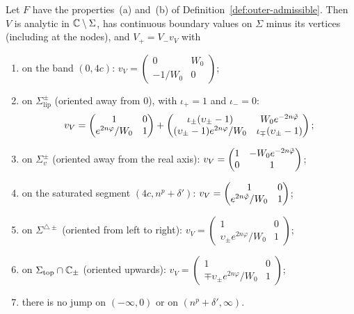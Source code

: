 \begin{lemma}[Jumps of $V$]\label{lem:jumpsV}
Let $F$ have the properties~(a) and~(b) of Definition~\ref{def:outer-admissible}. Then $V$ is analytic in
$\mathbb{C}\setminus\Sigma$, has continuous boundary values on $\Sigma$ minus its vertices (including at the nodes), and
$V_+=V_-v_V$ with
\begin{enumerate}
\item[(a)] on the band $(0,4c)$: $v_V=\begin{pmatrix}0&W_0\\-1/W_0&0\end{pmatrix}$;
\item[(b)] on $\Sigma^\pm_{\mathrm{lip}}$ (oriented away from $0$), with $\iota_+=1$ and $\iota_-=0$:
  \[
    v_V=\begin{pmatrix}1&0\\e^{2n\varphi}/W_0&1\end{pmatrix}
    +\begin{pmatrix}\iota_\pm(\upsilon_\pm-1)&W_0e^{-2n\tilde\varphi}\\(\upsilon_\pm-1)e^{2n\varphi}/W_0&\iota_\mp(\upsilon_\pm-1)\end{pmatrix};
  \]
\item[(c)] on $\Sigma_v^\pm$ (oriented away from the real axis): $v_V=\begin{pmatrix}1&-W_0e^{-2n\tilde\varphi}\\0&1\end{pmatrix}$;
\item[(d)] on the saturated segment $(4c,n^p+\delta')$: $v_V=\begin{pmatrix}1&0\\e^{2n\tilde\varphi}/W_0&1\end{pmatrix}$;
\item[(e)] on $\Sigma^{\triangle\pm}$ (oriented from left to right): $v_V=\begin{pmatrix}1&0\\\upsilon_\pm e^{2n\varphi}/W_0&1\end{pmatrix}$;
\item[(f)] on $\Sigma_{\mathrm{top}}\cap\mathbb{C}_\pm$ (oriented upwards): $v_V=\begin{pmatrix}1&0\\\mp\upsilon_\pm e^{2n\varphi}/W_0&1\end{pmatrix}$;
\item[(g)] there is no jump on $(-\infty,0)$ or on $(n^p+\delta',\infty)$.
\end{enumerate}
\end{lemma}

